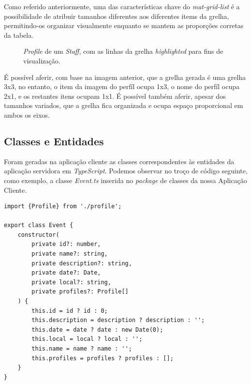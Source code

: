 Como referido anteriormente, uma das características chave do \textit{mat-grid-list} é a possibilidade de atribuir tamanhos diferentes aos diferentes items da grelha, permitindo-os organizar visualmente enquanto se mantem as proporções corretas da tabela. 

\begin{figure}[h]
	\begin{center}
	\end{center}
	\caption{\textit{Profile} de um \textit{Staff}, com as linhas da grelha \textit{highlighted} para fins de visualização. }\label{fig:calendarall}
\end{figure}

É possível aferir, com base na imagem anterior, que a grelha gerada é uma grelha 3x3, no entanto, o item da imagem do perfíl ocupa 1x3, o nome do perfíl ocupa 2x1, e os restantes itens ocupam 1x1. É possível também aferir, apesar dos tamanhos variados, que a grelha fica organizada e ocupa espaço proporcional em ambos os eixos.

\subsection{Classes e Entidades}

Foram geradas na aplicação cliente as classes correspondentes às entidades da aplicação servidora em \emph{TypeScript}. Podemos observar no troço de código seguinte, como exemplo, a classe \emph{Event.ts} inserida no \emph{package} de classes da nossa Aplicação Cliente.

\begin{lstlisting}
import {Profile} from './profile';

export class Event {
	constructor(
		private id?: number,
		private name?: string,
		private description?: string,
		private date?: Date,
		private local?: string,
		private profiles?: Profile[]
	) {
		this.id = id ? id : 0;
		this.description = description ? description : '';
		this.date = date ? date : new Date(0);
		this.local = local ? local : '';
		this.name = name ? name : '';
		this.profiles = profiles ? profiles : [];
	}
}
\end{lstlisting}

